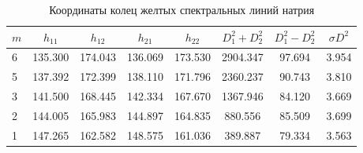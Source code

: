 \documentclass[12pt]{article}
\begin{document}
    \begin{table}[b]
        \centering
        \label{tab:tab3}
        \caption{Координаты колец желтых спектральных линий натрия}
        \begin{tabular}{|lccccccc|}
            \hline
            $m$ & $h_{11}$ & $h_{12}$ & $h_{21}$ & $h_{22}$ & $D_1^2 + D_2^2$ & $D_1^2 - D_2^2$ & $\sigma D^2$ \\\hline
            6   & 135.300  & 174.043  & 136.069  & 173.530  & 2904.347        & 97.694          & 3.954        \\
            5   & 137.392  & 172.399  & 138.110  & 171.796  & 2360.237        & 90.743          & 3.810        \\
            3   & 141.500  & 168.445  & 142.334  & 167.670  & 1367.946        & 84.120          & 3.669        \\
            2   & 144.005  & 165.983  & 144.897  & 164.835  & 880.556         & 85.509          & 3.699        \\
            1   & 147.265  & 162.582  & 148.575  & 161.036  & 389.887         & 79.334          & 3.563        \\\hline
        \end{tabular}
    \end{table}
\end{document}
